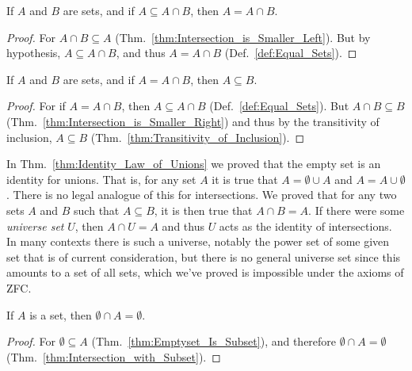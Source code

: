         \begin{theorem}
            \label{thm:Conv_Intersection_with_Subset}%
            If $A$ and $B$ are sets, and if $A\subseteq{A}\cap{B}$, then
            $A=A\cap{B}$.
        \end{theorem}
        \begin{proof}
            For $A\cap{B}\subseteq{A}$
            (Thm.~\ref{thm:Intersection_is_Smaller_Left}). But by hypothesis,
            $A\subseteq{A}\cap{B}$, and thus $A=A\cap{B}$
            (Def.~\ref{def:Equal_Sets}).
        \end{proof}
        \begin{theorem}
            \label{thm:Intersection_is_Equal}%
            If $A$ and $B$ are sets, and if $A=A\cap{B}$, then $A\subseteq{B}$.
        \end{theorem}
        \begin{proof}
            For if $A=A\cap{B}$, then $A\subseteq{A}\cap{B}$
            (Def.~\ref{def:Equal_Sets}). But $A\cap{B}\subseteq{B}$
            (Thm.~\ref{thm:Intersection_is_Smaller_Right}) and thus by the
            transitivity of inclusion, $A\subseteq{B}$
            (Thm.~\ref{thm:Transitivity_of_Inclusion}).
        \end{proof}
        In Thm.~\ref{thm:Identity_Law_of_Unions} we proved that the empty set is
        an identity for unions. That is, for any set $A$ it is true that
        $A=\emptyset\cup{A}$ and $A=A\cup\emptyset$. There is no legal analogue
        of this for intersections. We proved that for any two sets $A$ and $B$
        such that $A\subseteq{B}$, it is then true that $A\cap{B}=A$. If there
        were some \textit{universe set} $U$, then $A\cap{U}=A$ and thus $U$ acts
        as the identity of intersections. In many contexts there is such a
        universe, notably the power set of some given set that is of current
        consideration, but there is no general universe set since this amounts
        to a set of all sets, which we've proved is impossible under the axioms
        of ZFC.
        \begin{theorem}
            \label{thm:Intersection_with_Emptyset}%
            If $A$ is a set, then $\emptyset\cap{A}=\emptyset$.
        \end{theorem}
        \begin{proof}
            For $\emptyset\subseteq{A}$ (Thm.~\ref{thm:Emptyset_Is_Subset}), and
            therefore $\emptyset\cap{A}=\emptyset$
            (Thm.~\ref{thm:Intersection_with_Subset}).
        \end{proof}
